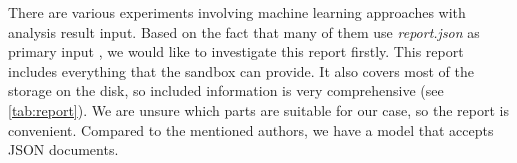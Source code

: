











There are various experiments involving machine learning approaches with analysis result input. Based on the fact that many of them use \emph{report.json} as primary input \cite{Darshan2016, Dinh2019a, Kim2020, Sethi2019}, we would like to investigate this report firstly. This report includes everything that the sandbox can provide. It also covers most of the storage on the disk, so included information is very comprehensive (see \ref{tab:report}). We are unsure which parts are suitable for our case, so the report is convenient. Compared to the mentioned authors, we have a model that accepts JSON documents.

